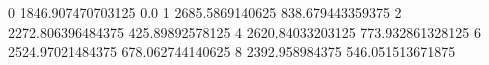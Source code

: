 0 1846.907470703125 0.0
1 2685.5869140625 838.679443359375
2 2272.806396484375 425.89892578125
4 2620.84033203125 773.932861328125
6 2524.97021484375 678.062744140625
8 2392.958984375 546.051513671875
